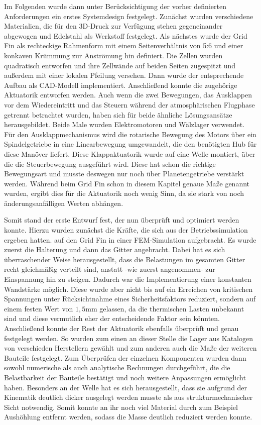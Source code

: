 Im Folgenden wurde dann unter Berücksichtigung der vorher definierten Anforderungen ein erstes Systemdesign festgelegt. Zunächst wurden verschiedene Materialien, die für den 3D-Druck zur Verfügung stehen gegeneinander abgewogen und Edelstahl als Werkstoff festgelegt. Als nächstes wurde der Grid Fin als rechteckige Rahmenform mit einem Seitenverhältnis von 5:6 und einer konkaven Krümmung zur Anströmung hin definiert. Die Zellen wurden quadratisch entworfen und ihre Zellwände auf beiden Seiten zugespitzt und außerdem mit einer lokalen Pfeilung versehen. Dann wurde der entsprechende Aufbau als CAD-Modell implementiert. Anschließend konnte die zugehörige Aktuatorik entworfen werden. Auch wenn die zwei Bewegungen, das Ausklappen vor dem Wiedereintritt und das Steuern während der atmosphärischen Flugphase getrennt betrachtet wurden, haben sich für beide ähnliche Lösungsansätze herausgebildet. Beide Male wurden Elektromotoren und Wälzlager verwendet. Für den Ausklappmechanismus wird die rotarische Bewegung des Motors über ein Spindelgetriebe in eine Linearbewegung  umgewandelt, die den benötigten Hub für diese Manöver liefert. Diese Klappaktuatorik wurde auf eine Welle montiert, über die die Steuerbewegung ausgeführt wird. Diese hat schon die richtige Bewegungsart und musste deswegen nur noch über Planetengetriebe verstärkt werden. Während beim Grid Fin schon in diesem Kapitel genaue Maße genannt wurden, ergibt dies für die Aktuatorik noch wenig Sinn, da sie stark von noch änderungsanfälligen Werten abhängen.

Somit stand der erste Entwurf fest, der nun überprüft und optimiert werden konnte. Hierzu wurden zunächst die Kräfte, die sich aus der Betriebssimulation ergeben hatten. auf den Grid Fin in einer FEM-Simulation aufgebracht. Es wurde zuerst die Halterung und dann das Gitter angebracht. Dabei hat es sich überraschender Weise herausgestellt, dass die Belastungen im gesamten Gitter recht gleichmäßig verteilt sind, anstatt -wie zuerst angenommen- zur Einspannung hin zu steigen. Dadurch war die Implementierung einer konstanten Wandstärke möglich. Diese wurde aber nicht bis auf ein Erreichen von kritischen Spannungen unter Rücksichtnahme eines Sicherheitsfaktors reduziert, sondern auf einem festen Wert von $1,5$mm gelassen, da die thermischen Lasten unbekannt sind und diese vermutlich eher der entscheidende Faktor sein könnten. Anschließend konnte der Rest der Aktuatorik ebenfalls überprüft und genau festgelegt werden. So wurden zum einen an dieser Stelle die Lager aus Katalogen von verschieden Herstellern gewählt und zum anderen auch die Maße der weiteren Bauteile festgelegt. Zum Überprüfen der einzelnen Komponenten wurden dann sowohl numerische als auch analytische Rechnungen durchgeführt, die die Belastbarkeit der Bauteile bestätigt und noch weitere Anpassungen ermöglicht haben. Besonders an der Welle hat es sich herausgestellt, dass sie aufgrund der Kinematik deutlich dicker ausgelegt werden musste als aus strukturmechanischer Sicht notwendig. Somit konnte an ihr noch viel Material durch zum Beispiel Aushöhlung entfernt werden, sodass  die Masse deutlich reduziert werden konnte.

